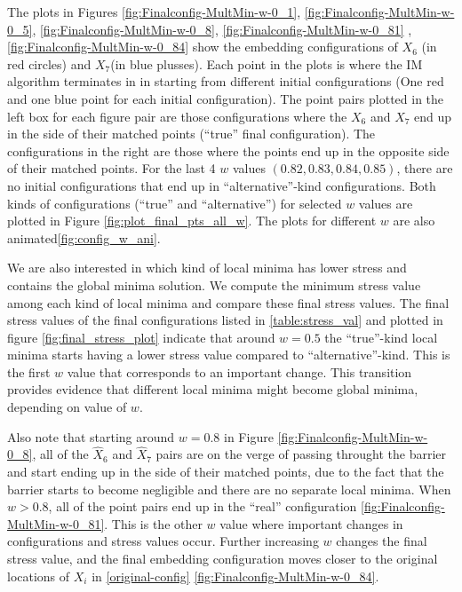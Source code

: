 \documentclass[12pt,oneside,final]{thesis}
\begin{document}
The plots in Figures \ref{fig:Finalconfig-MultMin-w-0_1}, \ref{fig:Finalconfig-MultMin-w-0_5}, \ref{fig:Finalconfig-MultMin-w-0_8}, \ref{fig:Finalconfig-MultMin-w-0_81} , \ref{fig:Finalconfig-MultMin-w-0_84} show the  embedding configurations of ${X}_6$ (in red circles) and ${X}_7$(in blue plusses). Each point in the plots is where the IM algorithm terminates in in starting from different initial configurations (One red and one blue point for each  initial configuration). The point pairs plotted in the left box for each figure pair are those configurations  where the  ${X}_6$ and ${X}_7$ end up in the side of their matched points (``true'' final configuration). The configurations in the right are those where the points end up in the opposite side of their matched points. For the last 4 $w$ values $(0.82,0.83,0.84,0.85)$, there are no initial configurations that end up in ``alternative''-kind configurations. Both kinds of  configurations (``true'' and ``alternative'') for selected $w$ values are plotted in Figure \ref{fig:plot_final_pts_all_w}. The plots for different $w$ are also animated\ref{fig:config_w_ani}.

We are also interested in which kind of local minima has lower stress and contains the global minima solution. We compute  the minimum stress value among each kind of local minima and compare these final stress values. The final stress values of the final configurations listed in  \autoref{table:stress_val} and plotted in figure \ref{fig:final_stress_plot} indicate that around $w=0.5$ the  ``true''-kind local minima   starts having a lower stress value compared to ``alternative''-kind.  This is the first $w$ value that corresponds to an important change. This transition provides evidence that different local minima might become global minima, depending on value of $w$.

Also note that starting around $w=0.8$ in Figure \ref{fig:Finalconfig-MultMin-w-0_8}, all of the $\hat{X}_6$ and $\hat{X}_7$  pairs are on the verge of passing throught the barrier and start ending up in the side of their matched points, due to the fact that the barrier starts to become negligible and there are no separate local minima. When $w>0.8$, all of the point pairs end up in  the ``real'' configuration \ref{fig:Finalconfig-MultMin-w-0_81}. This is the other $w$ value where important changes in configurations and stress values occur. Further increasing $w$ changes the final stress value, and  the final embedding configuration moves closer to the original locations of $X_{i}$ in \ref{original-config} \ref{fig:Finalconfig-MultMin-w-0_84}.
\end{document}
